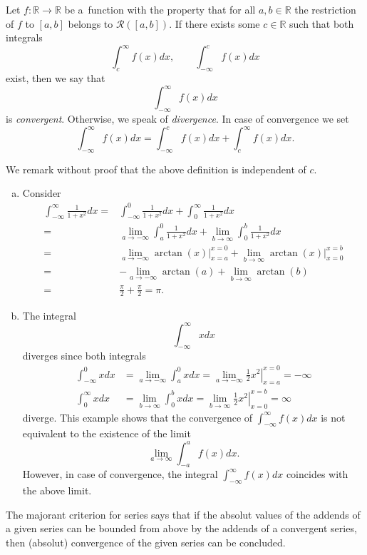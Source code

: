 \begin{Definition}{}
Let $f:\mathbb{R}\to\mathbb{R}$ be a~function with the property that for all $a,b\in\mathbb{R}$ the restriction of $f$ to $[a,b]$ belongs to $\mathcal{R}([a,b])$. If there exists some $c\in\mathbb{R}$ such that both integrals
\[\int_c^\infty f(x)dx,\qquad \int_{-\infty}^c f(x)dx\]
exist, then we say that
\[\int_{-\infty}^\infty f(x)dx\]
is \emph{convergent}. Otherwise, we speak of \emph{divergence}.
In case of convergence we set
\[\int_{-\infty}^\infty f(x)dx=\int_{-\infty}^c f(x)dx+\int_c^\infty f(x)dx.\]
\end{Definition}
We remark without proof that the above definition is independent of $c$.

\begin{example}
\begin{enumerate}[a)]
\item Consider
\[
\begin{aligned}
\int_{-\infty}^\infty\frac1{1+x^2}dx=&
\int_{-\infty}^0\frac1{1+x^2}dx+\int_0^\infty \frac1{1+x^2}dx\\
=&\lim_{a\to-\infty}\int_{a}^0\frac1{1+x^2}dx+\lim_{b\to\infty}\int_{0}^b\frac1{1+x^2}dx\\
=&\lim_{a\to-\infty}\left.\arctan(x)\right|_{x=a}^{x=0}+\lim_{b\to\infty}\left.\arctan(x)\right|_{x=0}^{x=b}\\
=&-\lim_{a\to-\infty}\arctan(a)+\lim_{b\to\infty}\arctan(b)\\
=&\frac\pi2+\frac\pi2=\pi.
\end{aligned}
\]
\item The integral
\[
\int_{-\infty}^\infty xdx
\]
diverges since both integrals
\[
\begin{aligned}
\int_{-\infty}^0 xdx&=\lim_{a\to-\infty}\int_{a}^0 xdx=\lim_{a\to-\infty}\left.\frac12x^2\right|_{x=a}^{x=0}=-\infty\\
\int_{0}^\infty xdx&=\lim_{b\to\infty}\int_{0}^b xdx=\lim_{b\to\infty}\left.\frac12x^2\right|_{x=0}^{x=b}=\infty
\end{aligned}
\]
diverge. This example shows that the convergence of $\int_{-\infty}^\infty f(x)dx$ is not equivalent to the existence of the limit
\[\lim_{a\to\infty}\int_{-a}^af(x)dx.\]
However, in case of convergence, the integral $\int_{-\infty}^\infty f(x)dx$ coincides with the above limit.
\end{enumerate}
\end{example}
The majorant criterion for series says that if the absolut values of the addends of a given series can be bounded from above 
by the addends of a convergent series, then (absolut) convergence of the given series can be concluded. 

